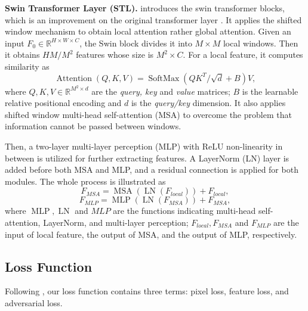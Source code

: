 \documentclass[10pt,journal]{IEEEtran}
\begin{document}
\textbf{Swin Transformer Layer (STL).} \label{STL}
\cite{liuSwinTransformerHierarchical2021} introduces the swin transformer blocks, which is an improvement on the original transformer layer \cite{vaswaniAttentionAllYou2017}. It applies the shifted window mechanism to obtain local attention rather global attention. Given an input $F_{0}\in \mathbb{R}^{ H\times W\times C}$, the Swin block divides it into $M \times M$ local windows. Then it obtains $HM/M^{2}$ features whose size is $M^{2} \times C$. For a local feature, it computes similarity as
\begin{equation}
	\operatorname{Attention}(Q,K,V)=\operatorname{SoftMax}(QK^{T}/\sqrt{d}+B)V,  \label{eq5}
\end{equation}
where $Q, K, V\in \mathbb{R}^{M^{2}\times d}$ are the \textit{query, key} and \textit{value} matrices; $B$ is the learnable relative positional encoding and $d$ is the \textit{query/key} dimension. It also applies shifted window multi-head self-attention (MSA) to overcome the problem that information cannot be passed between windows. 

Then, a two-layer multi-layer perception (MLP) with ReLU non-linearity in between is utilized for further extracting features. A LayerNorm (LN) layer is added before both MSA and MLP, and a residual connection is applied for both modules. The whole process is illustrated as 
\begin{equation}
	F_{MSA} = \operatorname{MSA}(\operatorname{LN}(F_{local})) + F_{local},  \label{eq6}
\end{equation}
\begin{equation}
	F_{MLP} = \operatorname{MLP}(\operatorname{LN}(F_{MSA})) + F_{MSA},  \label{eq7}
\end{equation}
where $\operatorname{MLP}, \operatorname{LN}$ and $MLP$ are the functions indicating multi-head self-attention, LayerNorm, and multi-layer perception; $F_{local}, F_{MSA}$ and $F_{MLP}$ are the input of local feature, the output of MSA, and the output of MLP, respectively. 


\subsection{Loss Function}
Following \cite{weiSingleImageReflection2019}, our loss function contains three terms: pixel loss, feature loss, and adversarial loss.
\end{document}
